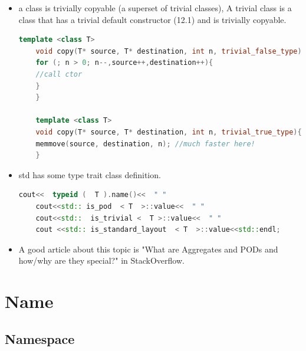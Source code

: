 \documentclass[a4paper,11pt,twoside]{book}
\begin{document}
\begin{itemize}
	\item a class is trivially copyable (a superset of trivial classes), A trivial class is a class that has a trivial default constructor (12.1) and is trivially copyable.
	
	
	
	\begin{lstlisting}[frame=single, language=c++]
	template <class T> 
	void copy(T* source, T* destination, int n, trivial_false_type){
	for (; n > 0; n--,source++,destination++){
	//call ctor
	}
	}
	
	template <class T> 
	void copy(T* source, T* destination, int n, trivial_true_type){
	memmove(source, destination, n); //much faster here!
	}
	\end{lstlisting}
	
	
	\item std has some type trait class definition. 
	\begin{lstlisting}[frame=single, language=c++]
	cout<<  typeid (  T ).name()<<  " "  
	cout<<std:: is_pod  < T  >::value<<  " " 
	cout<<std::  is_trivial <  T >::value<<  " "  
	cout <<std:: is_standard_layout  < T  >::value<<std::endl;
	\end{lstlisting}
	
	\item A good article about this topic is "What are Aggregates and PODs and how/why are they special?" in StackOverflow. 
\end{itemize}


\section{Name}
\subsection{Namespace}
\end{document}
